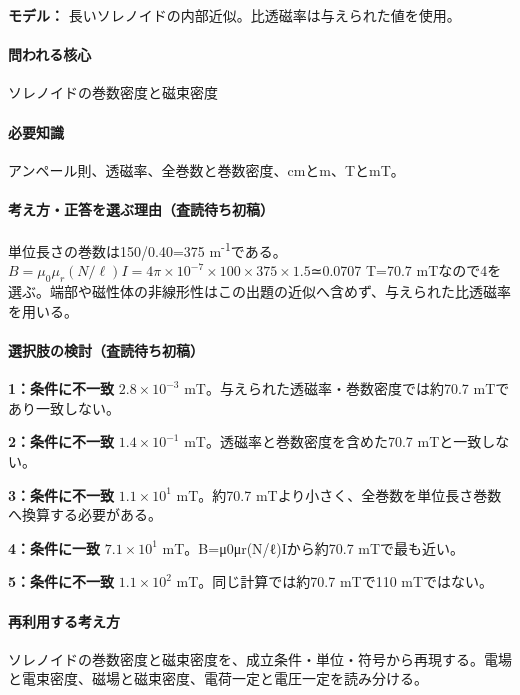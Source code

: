 \noindent\textbf{モデル：} 長いソレノイドの内部近似。比透磁率は与えられた値を使用。\par

\paragraph{問われる核心} ソレノイドの巻数密度と磁束密度

\paragraph{必要知識} アンペール則、透磁率、全巻数と巻数密度、cmとm、TとmT。

\paragraph{考え方・正答を選ぶ理由（査読待ち初稿）} 単位長さの巻数は150/0.40=\allowbreak{}375 m\textsuperscript{-1}である。\(B=\mu_0\mu_r(N/\ell)I=4\pi\times10^{-7}\times100\times375\times1.5\)≃0.0707 T=\allowbreak{}70.7 mTなので4を選ぶ。端部や磁性体の非線形性はこの出題の近似へ含めず、与えられた比透磁率を用いる。

\paragraph{選択肢の検討（査読待ち初稿）}\mbox{}\par

\noindent\textbf{1：条件に不一致} \(2.8\times10^{-3}\) mT。与えられた透磁率・巻数密度では約70.7 mTであり一致しない。\par

\noindent\textbf{2：条件に不一致} \(1.4\times10^{-1}\) mT。透磁率と巻数密度を含めた70.7 mTと一致しない。\par

\noindent\textbf{3：条件に不一致} \(1.1\times10^1\) mT。約70.7 mTより小さく、全巻数を単位長さ巻数へ換算する必要がある。\par

\noindent\textbf{4：条件に一致} \(7.1\times10^1\) mT。B=μ0μr(N/ℓ)Iから約70.7 mTで最も近い。\par

\noindent\textbf{5：条件に不一致} \(1.1\times10^2\) mT。同じ計算では約70.7 mTで110 mTではない。\par

\paragraph{再利用する考え方} ソレノイドの巻数密度と磁束密度を、成立条件・単位・符号から再現する。電場と電束密度、磁場と磁束密度、電荷一定と電圧一定を読み分ける。

